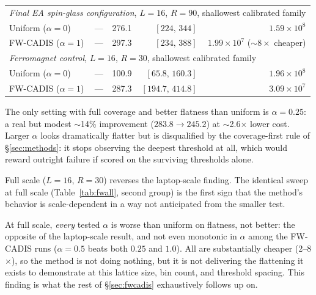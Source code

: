 \documentclass[a4paper,fleqn]{cas-sc}
\begin{document}
\begin{table}[H]
\begin{tabular}{lrrrr}
			\multicolumn{5}{l}{\emph{Final EA spin-glass configuration}, $L=16$, $R=90$, shallowest calibrated family} \\
			Uniform ($\alpha=0$) & --- & 276.1 & $[224,\,344]$ & $1.59\times10^{8}$ \\
			FW-CADIS ($\alpha=1$) & --- & 297.3 & $[234,\,388]$ & $1.99\times10^{7}$ ($\sim\!8\times$ cheaper) \\
			\multicolumn{5}{l}{\emph{Ferromagnet control}, $L=16$, $R=30$, shallowest calibrated family} \\
			Uniform ($\alpha=0$) & --- & 100.9 & $[65.8,\,160.3]$ & $1.96\times10^{8}$ \\
			FW-CADIS ($\alpha=1$) & --- & 287.3 & $[194.7,\,414.8]$ & $3.09\times10^{7}$ \\
			\bottomrule
		\end{tabular}
	\end{table}
	
	The only setting with full coverage and better flatness than uniform is $\alpha=0.25$: a
	real but modest $\sim$14\% improvement ($283.8\to245.2$) at $\sim$2.6$\times$ lower cost.
	Larger $\alpha$ looks dramatically flatter but is disqualified by the coverage-first rule
	of \S\ref{sec:methods}: it stops observing the deepest threshold at all, which would reward
	outright failure if scored on the surviving thresholds alone.
	
	Full scale ($L=16$, $R=30$) reverses the laptop-scale finding. The identical sweep
	at full scale (Table~\ref{tab:fwall}, second group) is the first sign that the method's
	behavior is scale-dependent in a way not anticipated from the smaller test.
	
	At full scale, \emph{every} tested $\alpha$ is worse than uniform on flatness, not better:
	the opposite of the laptop-scale result, and not even monotonic in $\alpha$ among the
	FW-CADIS runs ($\alpha=0.5$ beats both $0.25$ and $1.0$). All are substantially cheaper
	(2--8$\times$), so the method is not doing nothing, but it is not delivering the flattening
	it exists to demonstrate at this lattice size, bin count, and threshold spacing. This
	finding is what the rest of \S\ref{sec:fwcadis} exhaustively follows up on.
	
\end{document}
